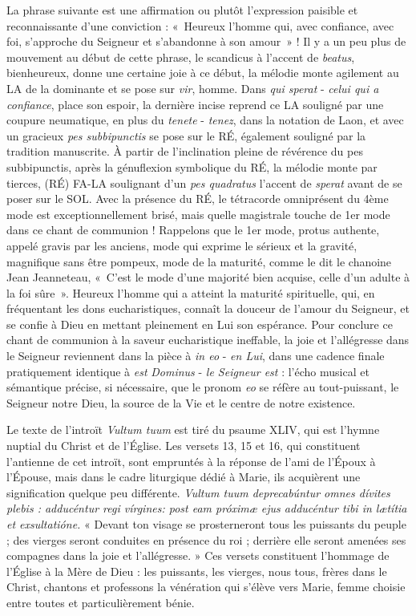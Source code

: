 \documentclass[Session2026.tex]{subfiles}
\begin{document}
La phrase suivante est une affirmation ou plutôt l'expression paisible
et reconnaissante d'une conviction : «~Heureux l'homme qui, avec
confiance, avec foi, s'approche du Seigneur et s'abandonne à son amour~»
! Il y a un peu plus de mouvement au début de cette phrase, le scandicus
à l'accent de \emph{beatus}, bienheureux, donne une certaine joie à ce
début, la mélodie monte agilement au LA de la dominante et se pose sur
\emph{vir}, homme. Dans \emph{qui sperat} - \emph{celui qui a
confiance}, place son espoir, la dernière incise reprend ce LA souligné
par une coupure neumatique, en plus du \emph{tenete} - \emph{tenez},
dans la notation de Laon, et avec un gracieux \emph{pes subbipunctis} se
pose sur le RÉ, également souligné par la tradition manuscrite. À partir
de l'inclination pleine de révérence du pes subbipunctis, après la
génuflexion symbolique du RÉ, la mélodie monte par tierces, (RÉ) FA-LA
soulignant d'un \emph{pes quadratus} l'accent de \emph{sperat} avant de
se poser sur le SOL. Avec la présence du RÉ, le tétracorde omniprésent
du 4ème mode est exceptionnellement brisé, mais quelle magistrale touche
de 1er mode dans ce chant de communion ! Rappelons que le 1er mode,
protus authente, appelé gravis par les anciens, mode qui exprime le
sérieux et la gravité, magnifique sans être pompeux, mode de la
maturité, comme le dit le chanoine Jean Jeanneteau, «~C'est le mode
d'une majorité bien acquise, celle d'un adulte à la foi sûre~». Heureux
l'homme qui a atteint la maturité spirituelle, qui, en fréquentant les
dons eucharistiques, connaît la douceur de l'amour du Seigneur, et se
confie à Dieu en mettant pleinement en Lui son espérance. Pour conclure
ce chant de communion à la saveur eucharistique ineffable, la joie et
l'allégresse dans le Seigneur reviennent dans la pièce à \emph{in eo} -
\emph{en Lui}, dans une cadence finale pratiquement identique à
\emph{est} \emph{Dominus} - \emph{le Seigneur est} : l'écho musical et
sémantique précise, si nécessaire, que le pronom \emph{eo} se réfère au
tout-puissant, le Seigneur notre Dieu, la source de la Vie et le centre
de notre existence.


Le texte de l'introït \emph{Vultum tuum} est tiré du psaume XLIV, qui
est l'hymne nuptial du Christ et de l'Église. Les versets 13, 15 et 16,
qui constituent l'antienne de cet introït, sont empruntés à la réponse
de l'ami de l'Époux à l'Épouse, mais dans le cadre liturgique dédié à
Marie, ils acquièrent une signification quelque peu différente.
\emph{Vultum tuum deprecabúntur omnes dívites plebis : adducéntur regi
vírgines: post eam próximæ ejus adducéntur tibi in lætítia et
exsultatióne.} « Devant ton visage se prosterneront tous les puissants
du peuple ; des vierges seront conduites en présence du roi ; derrière
elle seront amenées ses compagnes dans la joie et l'allégresse. » Ces
versets constituent l'hommage de l'Église à la Mère de Dieu : les
puissants, les vierges, nous tous, frères dans le Christ, chantons et
professons la vénération qui s'élève vers Marie, femme choisie entre
toutes et particulièrement bénie.
\end{document}
